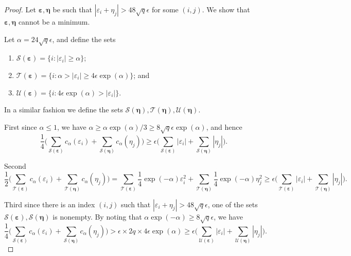 \documentclass[11pt,letterpaper]{article}
\begin{document}
\begin{proof}
	Let $\boldsymbol \varepsilon,\boldsymbol \eta$ be such that $| \varepsilon_i + \eta_j | > 48 \sqrt{q} \epsilon$ for some $(i,j)$.  We show that $\boldsymbol \varepsilon,\boldsymbol \eta$ cannot be a minimum.
	
	Let $\alpha = 24 \sqrt{q}\epsilon $, and define the sets
	\begin{enumerate}
		\item $\mathcal{S}(\boldsymbol \varepsilon) = \{i: | \varepsilon_i | \geq \alpha \}$;
		\item $\mathcal{T}(\boldsymbol \varepsilon)  = \{i: \alpha > | \varepsilon_i | \geq 4 \epsilon \exp(\alpha) \}$; and
		\item $\mathcal{U}(\boldsymbol \varepsilon)  = \{i: 4 \epsilon \exp(\alpha) > | \varepsilon_i | \}$.
	\end{enumerate}
	In a similar fashion we define the sets $\mathcal{S}(\boldsymbol \eta), \mathcal{T}(\boldsymbol \eta), \mathcal{U}(\boldsymbol \eta)$.
	
	First since $\alpha \leq 1$, we have $\alpha \geq \alpha\exp(\alpha)/3 \geq 8 \sqrt{q} \epsilon \exp(\alpha)$, and hence
	\begin{equation*}
		\frac{1}{4} \biggl( \sum_{\mathcal{S}(\boldsymbol \varepsilon)} c_{\alpha}(\varepsilon_i) + \sum_{\mathcal{S}(\boldsymbol \eta)} c_{\alpha}(\eta_j) \biggr) \geq \epsilon \biggl( \sum_{\mathcal{S}(\boldsymbol \varepsilon)} |\varepsilon_i| + \sum_{\mathcal{S}(\boldsymbol \eta)} |\eta_j| \biggr).
	\end{equation*}
	
	Second 
	\begin{equation*}
		\frac{1}{2} \biggl(\sum_{\mathcal{T}(\boldsymbol \varepsilon)} c_{\alpha}(\varepsilon_i) + \sum_{\mathcal{T}(\boldsymbol \eta)} c_{\alpha}(\eta_j) \biggr) = \sum_{\mathcal{T}(\boldsymbol \varepsilon)} \frac{1}{4} \exp(-\alpha) \varepsilon_i^2 + \sum_{\mathcal{T}(\boldsymbol \eta)} \frac{1}{4} \exp(-\alpha) \eta_j^2  \geq \epsilon \biggl( \sum_{\mathcal{T}(\boldsymbol \varepsilon)} |\varepsilon_i| + \sum_{\mathcal{T}(\boldsymbol \eta)} |\eta_j| \biggr).
	\end{equation*}
	
	Third since there is an index $(i,j)$ such that $| \varepsilon_i + \eta_j | > 48 \sqrt{q} \epsilon$, one of the sets $\mathcal{S}(\boldsymbol \varepsilon), \mathcal{S}(\boldsymbol \eta)$ is nonempty. By noting that $\alpha \exp(-\alpha) \geq 8 \sqrt{q} \epsilon$, we have
	\begin{equation*}
		\frac{1}{4} \biggl( \sum_{\mathcal{S}(\boldsymbol \varepsilon)} c_{\alpha}(\varepsilon_i) + \sum_{\mathcal{S}(\boldsymbol \eta)} c_{\alpha}(\eta_j) \biggr) > \epsilon \times 2q \times 4 \epsilon\exp(\alpha) \geq \epsilon \biggl( \sum_{\mathcal{U}(\boldsymbol \varepsilon)} |\varepsilon_i| + \sum_{\mathcal{U}(\boldsymbol \eta)} |\eta_j| \biggr).
	\end{equation*}
	

\end{proof}
\end{document}
